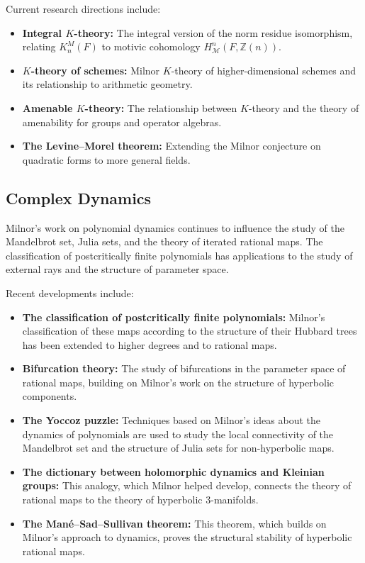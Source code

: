 Current research directions include:
\begin{itemize}
\item \textbf{Integral $K$-theory:} The integral version of the norm residue isomorphism, relating $K^M_n(F)$ to motivic cohomology $H^n_{\mathcal{M}}(F, \mathbb{Z}(n))$.
\item \textbf{$K$-theory of schemes:} Milnor $K$-theory of higher-dimensional schemes and its relationship to arithmetic geometry.
\item \textbf{Amenable $K$-theory:} The relationship between $K$-theory and the theory of amenability for groups and operator algebras.
\item \textbf{The Levine--Morel theorem:} Extending the Milnor conjecture on quadratic forms to more general fields.
\end{itemize}

\subsection{Complex Dynamics}

Milnor's work on polynomial dynamics continues to influence the study of the Mandelbrot set, Julia sets, and the theory of iterated rational maps. The classification of postcritically finite polynomials has applications to the study of external rays and the structure of parameter space.

Recent developments include:
\begin{itemize}
\item \textbf{The classification of postcritically finite polynomials:} Milnor's classification of these maps according to the structure of their Hubbard trees has been extended to higher degrees and to rational maps.
\item \textbf{Bifurcation theory:} The study of bifurcations in the parameter space of rational maps, building on Milnor's work on the structure of hyperbolic components.
\item \textbf{The Yoccoz puzzle:} Techniques based on Milnor's ideas about the dynamics of polynomials are used to study the local connectivity of the Mandelbrot set and the structure of Julia sets for non-hyperbolic maps.
\item \textbf{The dictionary between holomorphic dynamics and Kleinian groups:} This analogy, which Milnor helped develop, connects the theory of rational maps to the theory of hyperbolic 3-manifolds.
\item \textbf{The Mané--Sad--Sullivan theorem:} This theorem, which builds on Milnor's approach to dynamics, proves the structural stability of hyperbolic rational maps.
\end{itemize}

